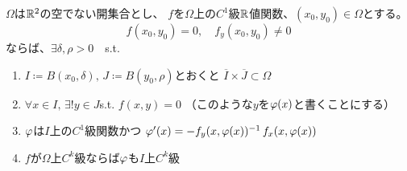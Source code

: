 \documentclass[report]{jlreq}
\begin{document}
\begin{theorem}[2次元版の陰関数定理]
    $\Omega$は$\mathbb{R}^2$の空でない開集合とし、
    $f$を$\Omega$上の$C^1$級$\mathbb{R}$値関数、$(x_0, y_0) \in \Omega$とする。
    \begin{equation}
        f(x_0, y_0) = 0,\quad f_y(x_0, y_0) \neq 0
    \end{equation}
    ならば、$\exists \delta, \rho > 0\quad$s.t.
    \begin{enumerate}
        \item $I \coloneqq B(x_0, \delta),\,
            J \coloneqq B(y_0, \rho)$とおくと
            $\overline{I} \times \overline{J} \subset \Omega$
        \item $\forall x \in I,\, \exists! y \in J$\quad s.t. \quad
            $f(x, y) = 0$
            \quad（このような$y$を$\varphi(x)$と書くことにする）
        \item $\varphi$は$I$上の$C^1$級関数かつ
            $\varphi'(x) = - f_y(x, \varphi(x))^{-1}\, f_x(x, \varphi(x))$
        \item $f$が$\Omega$上$C^k$級ならば$\varphi$も$I$上$C^k$級
    \end{enumerate}
\end{theorem}
\end{document}
